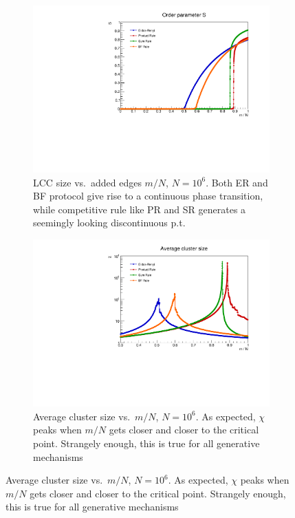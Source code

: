 \begin{figure}
	\centering
	\begin{subfigure}[t]{0.48\linewidth}
		\includegraphics[width=\linewidth]{images/S.pdf}
		\caption{LCC size vs.\ added edges $m/N$, $N = 10^6$. Both ER and BF protocol give rise to a continuous phase transition, while competitive rule like PR and SR generates a seemingly looking discontinuous p.t.}
		\label{fig::S}
	\end{subfigure}
	\hspace{3pt}
	\begin{subfigure}[t]{0.48\linewidth}
		\includegraphics[width=\linewidth]{images/ACS.pdf}
		\caption{Average cluster size vs.\ $m/N$, $N = 10^6$. As expected, $\chi$ peaks when $m/N$ gets closer and closer to the critical point. Strangely enough, this is true for all generative mechanisms}
		\label{fig::ACS}
	\end{subfigure}
\end{figure}

